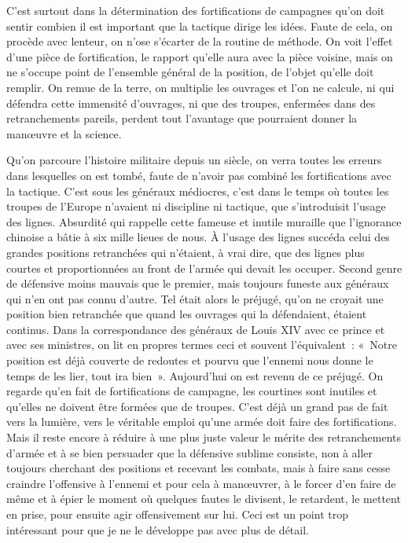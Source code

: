 \documentclass[french,twoside]{book} %
\begin{document}
C’est surtout dans la détermination des fortifications de campagnes qu’on doit sentir combien il est important que la tactique dirige les idées. Faute de cela, on procède avec lenteur, on n’ose s’écarter de la routine de méthode. On voit l’effet d’une pièce de fortification, le rapport qu’elle aura avec la pièce voisine, mais on ne s’occupe point de l’ensemble général de la position, de l’objet qu’elle doit remplir. On remue de la terre, on multiplie les ouvrages et l’on ne calcule, ni qui défendra cette immensité d’ouvrages, ni que des troupes, enfermées dans des retranchements pareils, perdent tout l’avantage que pourraient donner la manœuvre et la science.\par
Qu’on parcoure l’histoire militaire depuis un siècle, on verra toutes les erreurs dans lesquelles on est tombé, faute de n’avoir pas combiné les fortifications avec la tactique. C’est sous les généraux médiocres, c’est dans le temps où toutes les troupes de l’Europe n’avaient ni discipline ni tactique, que s’introduisit l’usage des lignes. Absurdité qui rappelle cette fameuse et inutile muraille que l’ignorance chinoise a bâtie à six mille lieues de nous. À l’usage des lignes succéda celui des grandes positions retranchées qui n’étaient, à vrai dire, que des lignes plus courtes et proportionnées au front de l’armée qui devait les occuper. Second genre de défensive moins mauvais que le premier, mais toujours funeste aux généraux qui n’en ont pas connu d’autre. Tel était alors le préjugé, qu’on ne croyait une position bien retranchée que quand les ouvrages qui la défendaient, étaient continus. Dans la correspondance des généraux de Louis XIV avec ce prince et avec ses ministres, on lit en propres termes ceci et souvent l’équivalent : « Notre position est déjà couverte de redoutes et pourvu que l’ennemi nous donne le temps de les lier, tout ira bien ». Aujourd’hui on est revenu de ce préjugé. On regarde qu’en fait de fortifications de campagne, les courtines sont inutiles et qu’elles ne doivent être formées que de troupes. C’est déjà un grand pas de fait vers la lumière, vers le véritable emploi qu’une armée doit faire des fortifications. Mais il reste encore à réduire à une plus juste valeur le mérite des retranchements d’armée et à se bien persuader que la défensive sublime consiste, non à aller toujours cherchant des positions et recevant les combats, mais à faire sans cesse craindre l’offensive à l’ennemi et pour cela à manœuvrer, à le forcer d’en faire de même et à épier le moment où quelques fautes le divisent, le retardent, le mettent en prise, pour ensuite agir offensivement sur lui. Ceci est un point trop intéressant pour que je ne le développe pas avec plus de détail.\par
\end{document}
